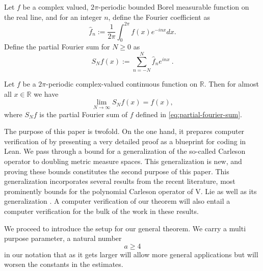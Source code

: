 Let $f$ be a complex valued, $2\pi$-periodic bounded Borel measurable function on the real line, and for an integer $n$, define the Fourier coefficient as
\begin{equation}
    \widehat{f}_n:=\frac {1}{2\pi} \int_0^{2\pi} f(x) e^{- i nx} dx .
\end{equation}
Define the partial Fourier sum for $N\ge 0$ as
\begin{equation}\label{eq:partial-fourier-sum}
    S_Nf(x):=\sum_{n=-N}^N \widehat{f}_n e^{i nx}\ .
\end{equation}

\begin{theorem}
    \label{classical-carleson}
    \leanok
    Let $f$ be a $2\pi$-periodic complex-valued continuous function on $\mathbb{R}$.
    Then for almost all $x \in \mathbb{R}$ we have
    \begin{equation}\label{eq:fourier-limit}
      \lim_{N\to\infty}S_N f(x) = f(x),
    \end{equation}
    where $S_N f$ is the partial Fourier sum of $f$ defined in \eqref{eq:partial-fourier-sum}.
\end{theorem}

The purpose of this paper is twofold. On the one hand, it prepares computer verification of  by presenting a very detailed proof as a blueprint for coding in Lean. We pass through a bound for a generalization of the so-called Carleson operator to doubling metric measure spaces. This generalization is new, and proving these bounds constitutes the second purpose of this paper. This generalization incorporates several results from the recent literature, most prominently bounds for the polynomial Carleson operator of V. Lie \cite{lie-polynomial} as well as its generalization \cite{zk-polynomial}. A computer verification of our theorem will also entail a computer verification for the bulk of the work in these results.

We proceed to introduce the setup for our general theorem.
We carry a multi purpose parameter, a natural number
\begin{equation}
    a\ge 4
\end{equation} in our notation that as it gets larger will allow more general applications but will worsen the constants in the estimates.



